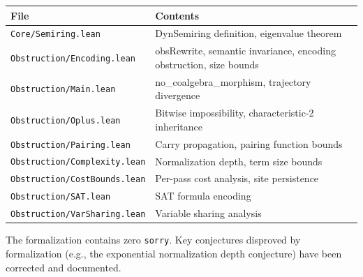 \documentclass[11pt,a4paper]{article}
\theoremstyle{definition}
\theoremstyle{remark}
\begin{document}
\begin{table}[h]
\centering
\begin{tabular}{ll}
\toprule
\textbf{File} & \textbf{Contents} \\
\midrule
\texttt{Core/Semiring.lean}
  & DynSemiring definition, eigenvalue theorem \\
\texttt{Obstruction/Encoding.lean}
  & obsRewrite, semantic invariance, encoding obstruction, size bounds \\
\texttt{Obstruction/Main.lean}
  & no\_coalgebra\_morphism, trajectory divergence \\
\texttt{Obstruction/Oplus.lean}
  & Bitwise impossibility, characteristic-2 inheritance \\
\texttt{Obstruction/Pairing.lean}
  & Carry propagation, pairing function bounds \\
\texttt{Obstruction/Complexity.lean}
  & Normalization depth, term size bounds \\
\texttt{Obstruction/CostBounds.lean}
  & Per-pass cost analysis, site persistence \\
\texttt{Obstruction/SAT.lean}
  & SAT formula encoding \\
\texttt{Obstruction/VarSharing.lean}
  & Variable sharing analysis \\
\bottomrule
\end{tabular}
\end{table}

The formalization contains zero \texttt{sorry}. Key conjectures disproved by
formalization (e.g., the exponential normalization depth conjecture) have
been corrected and documented.
\end{document}
